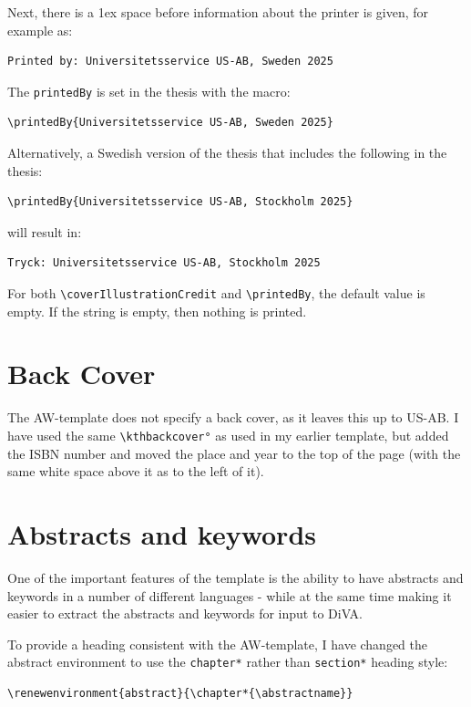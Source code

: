 \documentclass[12pt, twoside]{article}
\begin{document}
Next, there is a 1ex space before information about the printer is given, for example as:
\begin{verbatim}
Printed by: Universitetsservice US-AB, Sweden 2025
\end{verbatim}
The \texttt{printedBy} is set in the thesis with the macro:
\begin{lstlisting}[style=latexExampleForAuthors]
\printedBy{Universitetsservice US-AB, Sweden 2025}
\end{lstlisting}
Alternatively, a Swedish version of the thesis 
that includes the following in the thesis:
\begin{lstlisting}[style=latexExampleForAuthors]
\printedBy{Universitetsservice US-AB, Stockholm 2025}
\end{lstlisting}
will result in:
\begin{verbatim}
Tryck: Universitetsservice US-AB, Stockholm 2025
\end{verbatim}

For both \texttt{\textbackslash coverIllustrationCredit} and \texttt{\textbackslash printedBy}, the default value is empty. If the string is empty, then nothing is printed.

\section{Back Cover}
\label{sec:cycle3Backcover}

The AW-template does not specify a back cover, as it leaves this up to US-AB. I have used the same \texttt{\textbackslash kthbackcover°} as used in my earlier template, but \first added the ISBN number and \Second moved the place and year to the top of the page (with the same white space above it as to the left of it).

\section{Abstracts and keywords}
\label{sec:cycle3AbstractsAndKeywords}

One of the important features of the template is the ability to have abstracts and keywords in a number of different languages - while at the same time making it easier to extract the abstracts and keywords for input to \gls{DiVA}.

To provide a heading consistent with the AW-template, I have changed the abstract environment to use the \texttt{chapter*} rather than \texttt{section*} heading style:
\begin{lstlisting}[style=latexExampleForAuthors]
\renewenvironment{abstract}{\chapter*{\abstractname}}
\end{lstlisting}
\end{document}
